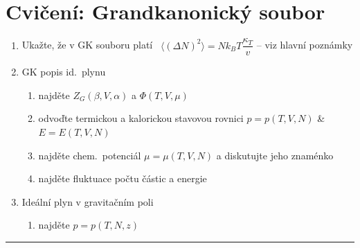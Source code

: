 \section{Cvičení: Grandkanonický soubor}

\begin{priklad}[Zadání]
\begin{enumerate}[label=\arabic*)]
  \item Ukažte, že v GK souboru platí \ $\langle(\Delta N)^2\rangle = Nk_BT\dfrac{\kappa_T}{v}$
        \quad \textcolor{NavyBlue}{-- viz hlavní poznámky}
  \item GK popis id.\ plynu
  \begin{enumerate}[label=\arabic*)]
    \item najděte $Z_G(\beta,V,\alpha)$ a $\Phi(T,V,\mu)$
    \item odvoďte termickou a kalorickou stavovou rovnici $p = p(T,V,N)$ \& $E = E(T,V,N)$
    \item najděte chem.\ potenciál $\mu = \mu(T,V,N)$ a diskutujte jeho znaménko
    \item najděte fluktuace počtu částic a energie
  \end{enumerate}
  \item[3)$^*$] Ideální plyn v gravitačním poli
  \begin{enumerate}[label=\arabic*)]
    \item najděte  $p = p(T,N,z)$
  \end{enumerate}
\end{enumerate}
\end{priklad}

\noindent\rule{\linewidth}{0.4pt}

